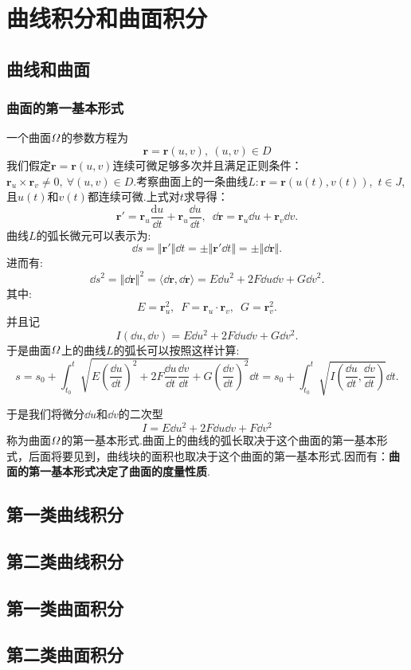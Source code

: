 \chapter{曲线积分和曲面积分}
\section{曲线和曲面}
    \subsection{曲面的第一基本形式}
    一个曲面\(\mit\Omega\)的参数方程为\[\bm{r}=\bm{r}(u,v),\ (u,v)\in D\]
    我们假定\(\bm{r}=\bm{r}(u,v)\)连续可微足够多次并且满足正则条件：\(\bm{r}_u\times\bm{r}_v\neq0,\ \forall(u,v)\in D\).考察曲面上的一条曲线\(L: \bm{r}=\bm{r}(u(t),v(t))\),\ \(t\in J\),且\(u(t)\)和\(v(t)\)都连续可微.上式对\(t\)求导得：
    \[\bm{r}'=\bm{r}_u\frac{\mathrm{d}u}{\dd t}+\bm{r}_u\frac{\dd u}{\dd t},\enspace\dd\bm{r}=\bm{r}_u\dd u+\bm{r}_v\dd v.\]
    曲线\(L\)的弧长微元可以表示为:\[\dd s=\Vert\bm{r}'\Vert\dd t=\pm\Vert\bm{r}'\dd t\Vert=\pm\Vert\dd\bm{r}\Vert.\]
    进而有:\[\dd s^2=\Vert\dd\bm{r}\Vert^2=\langle\dd\bm{r},\dd\bm{r}\rangle=E\dd u^2+2F\dd u\dd v+G\dd v^2.\]
    其中:\[E=\bm{r}_u^2,\enspace F=\bm{r}_u\cdot\bm{r}_v,\enspace G=\bm{r}_v^2.\]
    并且记\[I(\dd u,\dd v)=E\dd u^2+2F\dd u\dd v+G\dd v^2.\]
    于是曲面\(\mit\Omega\)上的曲线\(L\)的弧长可以按照这样计算:\[s=s_0+\int_{t_0}^{t}\sqrt{E\left(\frac{\dd u}{\dd t}\right)^2+2F\frac{\dd u}{\dd t}\frac{\dd v}{\dd t}+G\left(\frac{\dd v}{\dd t}\right)^2}\dd t=s_0+\int_{t_0}^{t}\sqrt{I\left(\frac{\dd u}{\dd t},\frac{\dd v}{\dd t}\right)}\dd t.\]

    于是我们将微分\(\dd u\)和\(\dd v\)的二次型\[I=E\dd u^2+2F\dd u\dd v+F\dd v^2\]称为曲面\(\mit\Omega\)的第一基本形式.曲面上的曲线的弧长取决于这个曲面的第一基本形式，后面将要见到，曲线块的面积也取决于这个曲面的第一基本形式.因而有：\textbf{曲面的第一基本形式决定了曲面的度量性质}.
    
\section{第一类曲线积分}
\section{第二类曲线积分}
\section{第一类曲面积分}
\section{第二类曲面积分}

